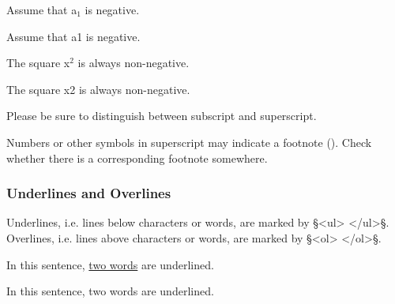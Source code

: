 \begin{example}[1: \, subscript]

\vspace{-4mm}
Assume that a$_1$ is negative.
\begin{typeLatin}
Assume that a\bold{<_>}1\bold{</_>} is negative.
\end{typeLatin}
\end{example}

\begin{example}[2: \, superscript]

\vspace{-4mm}
The square x$^2$ is always non-negative.
\begin{typeLatin}
The square x\bold{<^>}2\bold{</^>} is always non-negative.
\end{typeLatin}
\end{example}

\begin{note}
Please be sure to distinguish between subscript and superscript.
\end{note}

\begin{note}
Numbers or other symbols in superscript may indicate a footnote (). Check whether there is a corresponding footnote somewhere.
\end{note}

\subsubsection{Underlines and Overlines}
\label{section underlines and overlines}

\begin{mainrule}
Underlines, i.e. lines below characters or words, are marked by §<ul> </ul>§. 
Overlines, i.e. lines above characters or words, are marked by §<ol> </ol>§. 
\end{mainrule}


\vspace{3mm}
\begin{example}[1: \, underlines]

\vspace{-4mm}
In this sentence, \underline{two words} are underlined.

\vspace{-3mm}
\begin{typeLatin}
In this sentence, two words are underlined. \\
\end{typeLatin}
\end{example}

